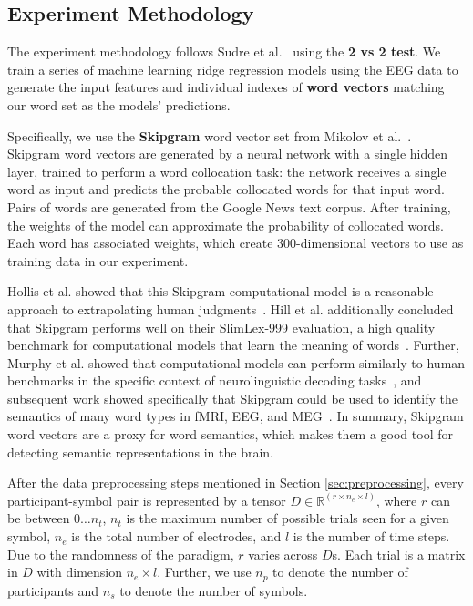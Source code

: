 \subsection{Experiment Methodology}
\label{sec:methodology}
The experiment methodology follows Sudre et al.~\cite{Sudre2012} using the {\bf 2 vs 2 test}. We train a series of machine learning ridge regression models using the EEG data to generate the input features and individual indexes of {\bf word vectors} matching our word set as the models' predictions.
  
Specifically, we use the {\bf Skipgram} word vector set from Mikolov et al.~\cite{Mikolov2013}. Skipgram word vectors are generated by a neural network with a single hidden layer, trained to perform a word collocation task: the network receives a single word as input and predicts the probable collocated words for that input word. Pairs of words are generated from the Google News text corpus. After training, the weights of the model can approximate the probability of collocated words. Each word has associated weights, which create 300-dimensional vectors to use as training data in our experiment.
  
Hollis et al. showed that this Skipgram computational model is a reasonable approach to extrapolating human judgments~\cite{hollis2017extrapolating}. Hill et al. additionally concluded that Skipgram performs well on their SlimLex-999 evaluation, a high quality benchmark for computational models that learn the meaning of words~\cite{hill2016simlex}. Further, Murphy et al. showed that computational models can perform similarly to human benchmarks in the specific context of neurolinguistic decoding tasks~\cite{Murphy2012}, and subsequent work showed specifically that Skipgram could be used to identify the semantics of many word types in fMRI, EEG, and MEG~\cite{xu2016brainbench}. In summary, Skipgram word vectors are a proxy for word semantics, which makes them a good tool for detecting semantic representations in the brain.
     
After the data preprocessing steps mentioned in Section \ref{sec:preprocessing}, every participant-symbol pair is represented by a tensor $D \in \mathbb{R}^{(r \times n_e \times l)}$, where $r$ can be between $0 \ldots n_t$, $n_t$ is the maximum number of possible trials seen for a given symbol, $n_e$ is the total number of electrodes, and $l$ is the number of time steps. Due to the randomness of the paradigm, $r$ varies across $D$s. Each trial is a matrix in $D$ with dimension $n_e \times l$. Further, we use $n_p$ to denote the number of participants and $n_s$ to denote the number of symbols. 
  
